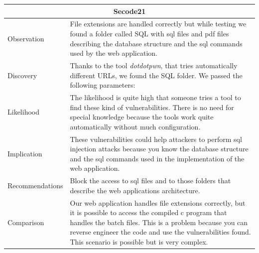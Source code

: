 \documentclass[headsepline,footsepline,footinclude=false,oneside,fontsize=11pt,paper=a4,listof=totoc,bibliography=totoc]{scrbook} %
\begin{document}
\begin{tabular}{ l|p{11cm}  }
	\hline
	\multicolumn{2}{c}{\textbf{Secode21}} \\ 
	\hline
	Observation   & File extensions are handled correctly but while testing we found a folder called SQL with sql files and pdf files describing the database structure and the sql commands used by the web application.    \\
	Discovery  & Thanks to the tool \textit{dotdotpwn}, that tries automatically different URLs, we found the SQL folder. We passed the following parameters: \\
	Likelihood & The likelihood is quite high that someone tries a tool to find these kind of vulnerabilities. There is no need for special knowledge because the tools work quite automatically without much configuration. \\
	Implication    & These vulnerabilities could help attackers to perform sql injection attacks because you know the database structure and the sql commands used in the implementation of the web application. \\
	Recommendations& Block the access to sql files and to those folders that describe the web applications architecture. \\ 
	Comparison& Our web application handles file extensions correctly, but it is possible to access the compiled c program that handles the batch files. This is a problem because you can reverse engineer the code and use the vulnerabilities found. This scenario is possible but is very complex. \\ 
	\hline
\end{tabular}
\\
\vspace{0.5cm}
\\
\end{document}
